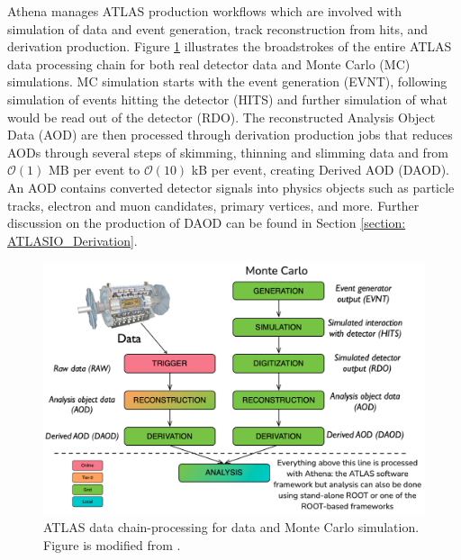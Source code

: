 Athena manages ATLAS production workflows which are involved with simulation of data and event generation, track reconstruction from hits, and derivation production.\cite{athenadocs}
Figure \ref{fig:ATLAS_data_chain} illustrates the broadstrokes of the entire ATLAS data processing chain for both real detector data and Monte Carlo (MC) simulations. 
MC simulation starts with the event generation (EVNT), following simulation of events hitting the detector (HITS) and further simulation of what would be read out of the detector (RDO).
The reconstructed Analysis Object Data (AOD) are then processed through derivation production jobs that reduces AODs through several steps of skimming, thinning and slimming data and from $\mathcal{O}(1)$ MB per event to $\mathcal{O}(10)$ kB per event, creating Derived AOD (DAOD).
An AOD contains converted detector signals into physics objects such as particle tracks, electron and muon candidates, primary vertices, and more.\cite{Aad:2895022}
Further discussion on the production of DAOD can be found in Section \ref{section: ATLASIO_Derivation}.
\begin{figure}[ht]
    \centering
    \includegraphics[width=\textwidth]{content/img/modified-James-chain-processing.png}
    \caption{ATLAS data chain-processing for data and Monte Carlo simulation. Figure is modified from \cite{James_Catmore_chain_processing}.}
    \label{fig:ATLAS_data_chain}
\end{figure}



